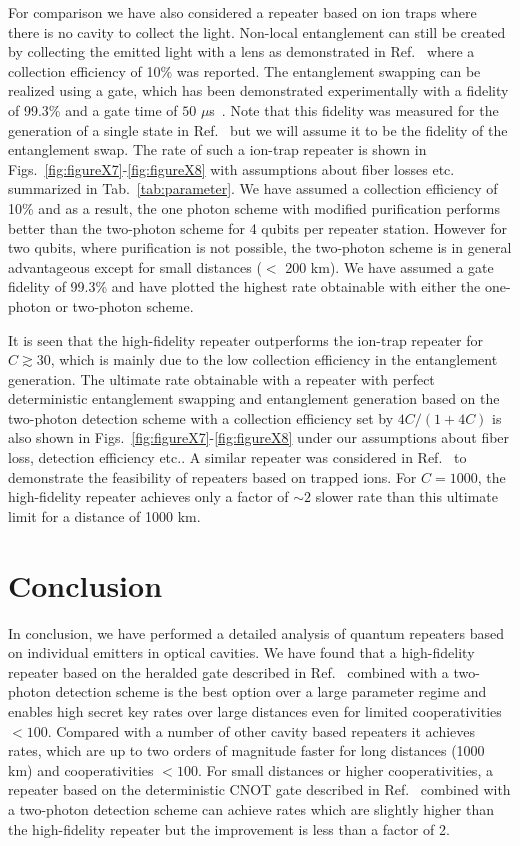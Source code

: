 For comparison we have also considered a repeater based on ion traps where there
is no cavity to collect the light. Non-local entanglement can still be created
by collecting the emitted light with a lens as demonstrated in
Ref.~\cite{monroe2014} where a collection efficiency of 10\% was reported. The
entanglement swapping can be realized using a gate, which has been demonstrated
experimentally with a fidelity of 99.3\% and a gate time of $50$
$\mu$s~\cite{blatt1}. Note that this fidelity was measured for the generation of
a single state in Ref.~\cite{blatt1} but we will assume it to be the fidelity of
the entanglement swap. The rate of such a ion-trap repeater is shown in
Figs.~\ref{fig:figureX7}-\ref{fig:figureX8} with assumptions about fiber losses
etc. summarized in Tab.~\ref{tab:parameter}. We have assumed a collection
efficiency of 10\% and as a result, the one photon scheme with modified
purification performs better than the two-photon scheme for 4 qubits per
repeater station. However for two qubits, where purification is not possible,
the two-photon scheme is in general advantageous except for small distances ($<$
200 km). We have assumed a gate fidelity of 99.3\% and have plotted the highest
rate obtainable with either the one-photon or two-photon scheme.

It is seen that the high-fidelity repeater outperforms the ion-trap repeater for
$C\gtrsim30$, which is mainly due to the low collection efficiency in the
entanglement generation. The ultimate rate obtainable with a repeater with
perfect deterministic entanglement swapping and entanglement generation based on
the two-photon detection scheme with a collection efficiency set by $4C/(1+4C)$
is also shown in Figs.~\ref{fig:figureX7}-\ref{fig:figureX8} under our
assumptions about fiber loss, detection efficiency etc.. A similar repeater was
considered in Ref.~\cite{sangouard2} to demonstrate the feasibility of repeaters
based on trapped ions. For $C=1000$, the high-fidelity repeater achieves only a
factor of $\sim2$ slower rate than this ultimate limit for a distance of 1000
km.

\section{Conclusion}        

In conclusion, we have performed a detailed analysis of quantum repeaters based
on individual emitters in optical cavities. We have found that a high-fidelity
repeater based on the heralded gate described in Ref.~\cite{johannes} combined
with a two-photon detection scheme is the best option over a large parameter
regime and enables high secret key rates over large distances even for limited
cooperativities $<100$. Compared with a number of other cavity based repeaters
it achieves rates, which are up to two orders of magnitude faster for long
distances (1000 km) and cooperativities $<100$. For small distances or higher
cooperativities, a repeater based on the deterministic CNOT gate described in
Ref.~\cite{Anders2prl} combined with a two-photon detection scheme can achieve
rates which are slightly higher than the high-fidelity repeater but the
improvement is less than a factor of 2.

